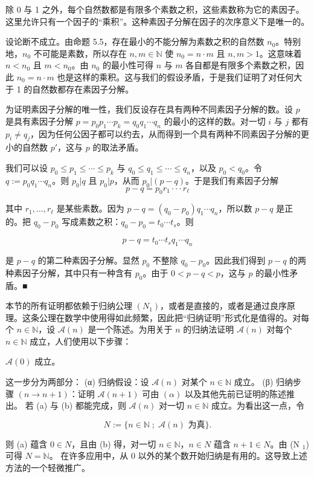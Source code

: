\begin{proposition}

除 0 与 1 之外，每个自然数都是有限多个素数之积，这些素数称为它的素因子。这里允许只有一个因子的“乘积”。这种素因子分解在因子的次序意义下是唯一的。

\proofhead
设论断不成立。由命题 5.5，存在最小的不能分解为素数之积的自然数 $ n_0 $。特别地，$ n_0 $ 不可能是素数，所以存在 $ n, m \in \mathbb{N} $ 使 $ n_0 = n \cdot m $ 且 $ n, m > 1 $。这意味着 $ n < n_0 $ 且 $ m < n_0 $。由 $ n_0 $ 的最小性可得 $ n $ 与 $ m $ 各自都是有限多个素数之积，因此 $ n_0 = n \cdot m $ 也是这样的乘积。这与我们的假设矛盾，于是我们证明了对任何大于 1 的自然数都存在素因子分解。

为证明素因子分解的唯一性，我们反设存在具有两种不同素因子分解的数。设 $p$ 是具有素因子分解 $p = p_0p_1 \cdots p_k = q_0q_1 \cdots q_n$ 的最小的这样的数。对一切 $i$ 与 $j$ 都有 $p_i \neq q_j$，因为任何公因子都可以约去，从而得到一个具有两种不同素因子分解的更小的自然数 $p'$，这与 $p$ 的取法矛盾。

我们可以设 $ p_0 \leq p_1 \leq \cdots \leq p_k $ 与 $ q_0 \leq q_1 \leq \cdots \leq q_n $，以及 $ p_0 < q_0 $。令 $ q := p_0 q_1 \cdots q_n $。则 $ p_0 | q $ 且 $ p_0 | p $，从而 $ p_0 | (p - q) $。于是我们有素因子分解
\[
p-q=p_0r_1\cdot\cdot\cdot r_\ell
\]

其中 $ r_1, \ldots, r_\ell $ 是某些素数。因为 $ p - q = (q_0 - p_0)q_1 \cdots q_n $，所以数 $ p - q $ 是正的。把 $ q_0 - p_0 $ 写成素数之积：$ q_0 - p_0 = t_0 \cdots t_s $。则

\[
p-q=t_{0}\cdots t_{s}q_{1}\cdots q_{n}
\]

是 $p - q$ 的第二种素因子分解。显然 $p_0$ 不整除 $q_0 - p_0$。因此我们得到 $p - q$ 的两种素因子分解，其中只有一种含有 $p_0$。由于 $0 < p - q < p$，这与 $p$ 的最小性矛盾。■

\end{proposition}

本节的所有证明都依赖于归纳公理 $(N_1)$，或者是直接的，或者是通过良序原理。这条公理在数学中使用得如此频繁，因此把“归纳证明”形式化是值得的。对每个 $n \in \mathbb{N}$，设 $\mathcal{A}(n)$ 是一个陈述。为用关于 $n$ 的归纳法证明 $\mathcal{A}(n)$ 对每个 $n \in \mathbb{N}$ 成立，人们使用以下步骤：

\begin{items}
\item

\proofhead
$ \mathcal{A}(0) $ 成立。
\item

这一步分为两部分：
(α) 归纳假设：设 $ \mathcal{A}(n) $ 对某个 $ n \in \mathbb{N} $ 成立。
(β) 归纳步骤 $ (n \to n+1) $：证明 $ \mathcal{A}(n+1) $ 可由 $ (\alpha) $ 以及其他先前已证明的陈述推出。
若 (a) 与 (b) 都能完成，则 $ \mathcal{A}(n) $ 对一切 $ n \in \mathbb{N} $ 成立。为看出这一点，令

\[
N:=\bigl\{n\in\mathbb{N}\;;\;\mathcal{A}(n)\text{ 为真}\bigr\}.
\]

则 (a) 蕴含 $ 0 \in N $，且由 (b) 得，对一切 $ n \in \mathbb{N} $，$ n \in N $ 蕴含 $ n + 1 \in N $。由 (N $ _1 $) 可得 $ N = \mathbb{N} $。
在许多应用中，从 0 以外的某个数开始归纳是有用的。这导致上述方法的一个轻微推广。

\end{items}


